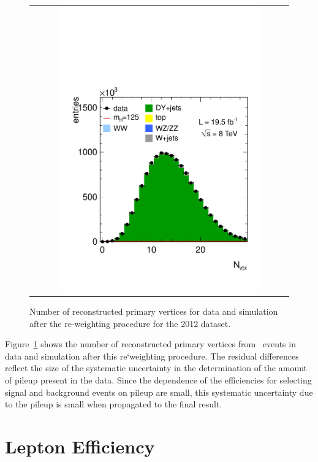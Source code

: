 \begin{figure}[htp] 
\centering 
\begin{tabular}{c} 
\includegraphics[width=0.8\textwidth]{figures/nvtx.pdf} 
\end{tabular} 
\caption{Number of reconstructed primary vertices for data and simulation 
after the re-weighting procedure for the 2012 dataset.}
\label{fig:nvtx} 
\end{figure} 

Figure~\ref{fig:nvtx} shows the number of reconstructed primary vertices 
from \dyll\ events in data and simulation after this re`weighting procedure. 
The residual differences reflect the size of the systematic uncertainty in the 
determination of the amount of pileup present in the data. 
Since the dependence of the efficiencies for selecting signal and background events 
on pileup are small, this systematic uncertainty due to the pileup is small when 
propagated to the final result.

\section{Lepton Efficiency}
\label{sec:lepeff}

